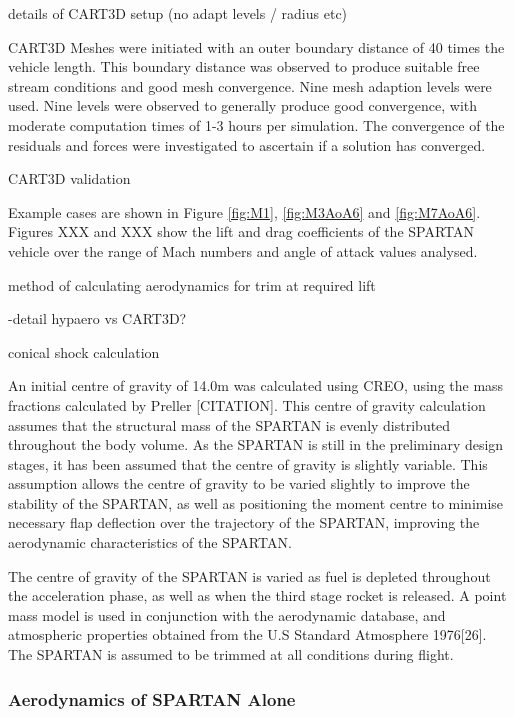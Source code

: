 		details of CART3D setup (no adapt levels / radius etc)
		
		CART3D Meshes were initiated with an outer boundary distance of 40 times the vehicle length. This boundary distance was observed to produce suitable free stream conditions and good mesh convergence. Nine mesh adaption levels were used. Nine levels were observed to generally produce good convergence, with moderate computation times of 1-3 hours per simulation. The convergence of the residuals and forces were investigated to ascertain if a solution has converged. 
		
		
		CART3D validation
		
		
		Example cases are shown in Figure \ref{fig:M1}, \ref{fig:M3AoA6} and \ref{fig:M7AoA6}. Figures XXX and XXX show the lift and drag coefficients of the SPARTAN vehicle over the range of Mach numbers and angle of attack values analysed.
		
		
		
		
		method of calculating aerodynamics for trim at required lift
		
		-detail hypaero vs CART3D? 
		
		
		conical shock calculation
		
		
		
An initial centre of gravity of 14.0m was calculated using CREO, using the mass fractions calculated by Preller [CITATION]. This centre of gravity calculation assumes that the structural mass of the SPARTAN is evenly distributed throughout the body volume. As the SPARTAN is still in the preliminary design stages, it has been assumed that the centre of gravity is slightly variable. This assumption allows the centre of gravity to be varied slightly to improve the stability of the SPARTAN, as well as positioning the moment centre to minimise necessary flap deflection over the trajectory of the SPARTAN, improving the aerodynamic characteristics of the SPARTAN. 



The centre of gravity of the SPARTAN is varied as fuel is depleted throughout the acceleration phase, as well as when the third stage rocket is released. A point mass model is used in conjunction with the aerodynamic database,
and atmospheric properties obtained from the U.S Standard Atmosphere 1976[26]. The SPARTAN is assumed to be
trimmed at all conditions during flight.






  \subsubsection{Aerodynamics of SPARTAN Alone}
  
